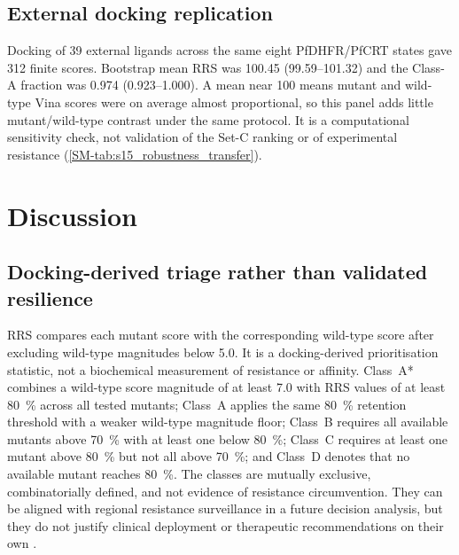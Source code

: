 \documentclass[journal=jcisd8,manuscript=article,layout=traditional]{achemso}
\begin{document}
\subsection{External docking replication}

Docking of \num{39} external ligands across the same eight PfDHFR/PfCRT states gave \num{312} finite scores. Bootstrap mean RRS was \num{100.45} (\numrange{99.59}{101.32}) and the Class-A fraction was \num{0.974} (\numrange{0.923}{1.000}). A mean near \num{100} means mutant and wild-type Vina scores were on average almost proportional, so this panel adds little mutant/wild-type contrast under the same protocol. It is a computational sensitivity check, not validation of the Set-C ranking or of experimental resistance (\cref{SM-tab:s15_robustness_transfer}).


\section{Discussion}

\subsection{Docking-derived triage rather than validated resilience}

RRS compares each mutant score with the corresponding wild-type score after excluding wild-type magnitudes below \qty{5.0}{\kcalmol}. It is a docking-derived prioritisation statistic, not a biochemical measurement of resistance or affinity. Class~A* combines a wild-type score magnitude of at least \qty{7.0}{\kcalmol} with RRS values of at least \qty{80}{\percent} across all tested mutants; Class~A applies the same \qty{80}{\percent} retention threshold with a weaker wild-type magnitude floor; Class~B requires all available mutants above \qty{70}{\percent} with at least one below \qty{80}{\percent}; Class~C requires at least one mutant above \qty{80}{\percent} but not all above \qty{70}{\percent}; and Class~D denotes that no available mutant reaches \qty{80}{\percent}. The classes are mutually exclusive, combinatorially defined, and not evidence of resistance circumvention. They can be aligned with regional resistance surveillance in a future decision analysis, but they do not justify clinical deployment or therapeutic recommendations on their own \citep{wwarn_2026}.
\end{document}
